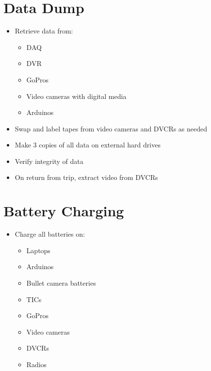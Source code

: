 \documentclass[11pt,oneside]{book}
\begin{document}
\section{Data Dump}

\begin{itemize}
\item Retrieve data from:
    \begin{itemize}
    \item DAQ
    \item DVR
    \item GoPros
    \item Video cameras with digital media
    \item Arduinos
    \end{itemize}

\item Swap and label tapes from video cameras and DVCRs as needed

\item Make 3 copies of all data on external hard drives

\item Verify integrity of data

\item On return from trip, extract video from DVCRs
\end{itemize}

\section{Battery Charging}

\begin{itemize}
\item Charge all batteries on:
    \begin{itemize}
    \item Laptops
    \item Arduinos
    \item Bullet camera batteries
    \item TICs
    \item GoPros
    \item Video cameras
    \item DVCRs
    \item Radios
    \end{itemize}
\end{itemize}
\end{document}
